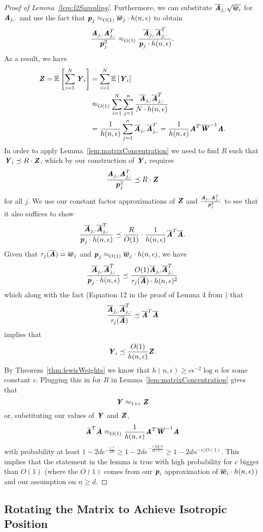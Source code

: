 \begin{proof}[Proof of Lemma~\ref{lem:l2Sampling}]
	Furthermore, we can substitute $\barA_{j,:}\sqrt{\lw_i}$ for $\AA_{j,:}$ and use the fact that $\pp_j \approx_{O(1)} \lw_j \cdot h(n,\epsilon)$ to obtain
	\[
		\frac{\AA_{j,:}\AA_{j,:}^T}{\pp_j^2} \approx_{O(1)} \frac{\barA_{j,:}\barA_{j,:}^T}{\pp_j \cdot h(n,\epsilon)}.
	\] 	
	As a result, we have
	\begin{align*}
	\ZZ = \expec{}{\sum_{i=1}^N \YY_i} &= \sum_{i=1}^N \expec{}{\YY_i} \\
	&\approx_{O(1)} \sum_{i=1}^N \sum_{j=1}^n \frac{\barA_{j,:}\barA_{j,:}^T}{N \cdot h(n,\epsilon)} \\
	&= \frac{1}{h(n,\epsilon)} \sum_{j=1}^n \barA_{j,:}\barA_{j,:}^T = \frac{1}{h(n,\epsilon)}\AA^T\LW^{-1}\AA.
	\end{align*}
	In order to apply Lemma~\ref{lem:matrixConcentration} we need to find $R$ such that $\YY_i \preceq R \cdot \ZZ$, which by our construction of $\YY_i$ requires 
	\[\frac{\AA_{j,:}\AA_{j,:}^T}{\pp_j^2} \preceq R\cdot \ZZ
	\]
	for all $j$. We use our constant factor approximations of $\ZZ$ and $\frac{\AA_{j,:}\AA_{j,:}^T}{\pp_j^2}$ to see that it also suffices to show
	\[
	\frac{\barA_{j,:}\barA_{j,:}^T}{\pp_j \cdot h(n,\epsilon)} \preceq \frac{R}{O(1)} \cdot \frac{1}{h(n,\epsilon)}\barA^T\barA.
	\]
	Given that $\tau_j(\barA) = \lw_j$ and $\pp_j \approx_{O(1)} \lw_j \cdot h(n,\epsilon)$, we have
	\[\frac{\barA_{j,:}\barA_{j,:}^T}{\pp_j \cdot h(n,\epsilon)} \preceq \frac{O(1)\barA_{j,:}\barA_{j,:}^T}{\tau_j(\barA) \cdot h(n,\epsilon)^2}
	\]
	which along with the fact (Equation 12 in the proof of Lemma 4 from \cite{CohenLMMPS15}) that 
	\[ \frac{\barA_{j,:}\barA_{j,:}^T}{\tau_j(\barA)} \preceq \barA^T\barA
	\]
	implies that
	\[\YY_i \preceq \frac{O(1)}{h(n,\epsilon)}\ZZ.
	\]
	By Theorem~\ref{thm:lewisWeights} we know that $h(n,\epsilon) \geq c \epsilon^{-2}\log{n}$ for some constant $c$. Plugging this in for $R$ in Lemma~\ref{lem:matrixConcentration} gives that 
	\[
	\YY \approx_{1 + \epsilon} \ZZ
	\]
	or, substituting our values of $\YY$ and $\ZZ$,
	\[ \tilde{\AA}^T\tilde{\AA} \approx_{O(1)} \frac{1}{h(n,\epsilon)}\AA^T\LW^{-1}\AA \]
	with probability at least $1 - 2de^{-\frac{\epsilon^{-2}}{3R}} \geq 1 - 2de^{-\frac{c\log{n}}{O(1)}} \geq 1 - 2dn^{-c/O(1)}$.
	This implies that the statement in the lemma is true with high probability for $c$ bigger than $O(1)$ (where the $O(1)$ comes from our $\pp_i$ approximation of $\lw_i\cdot h(n,\epsilon)$) and our assumption on $n \geq d$.
\end{proof}

\subsection{Rotating the Matrix to Achieve Isotropic Position}\label{subsec:rotate}

